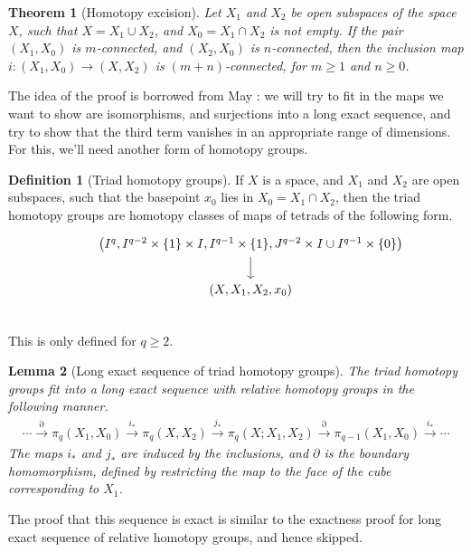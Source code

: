 \documentclass[12pt, notitlepage]{article}
\newtheorem{thm}{Theorem}[section]
\newtheorem{lem}[thm]{Lemma}
\theoremstyle{definition}
\newtheorem{defn}{Definition}[section]
\begin{document}
\begin{thm}[Homotopy excision]
  Let $X_1$ and $X_2$ be open subspaces of the space $X$, such that $X = X_1 \cup X_2$, and
  $X_0 = X_1 \cap X_2$ is not empty. If the pair $(X_1, X_0)$ is $m$-connected, and $(X_2, X_0)$ is
  $n$-connected, then the inclusion map $i: (X_1, X_0) \to (X, X_2)$ is $(m+n)$-connected, for
  $m \geq 1$ and $n \geq 0$.
\end{thm}
The idea of the proof is borrowed from May \cite{may} : we will try to fit in
the maps we want to show are isomorphisms, and surjections into a long exact sequence, and try to
show that the third term vanishes in an appropriate range of dimensions. For this, we'll need
another form of homotopy groups.

\begin{defn}[Triad homotopy groups]
  If $X$ is a space, and $X_1$ and $X_2$ are open subspaces, such that the basepoint $x_0$ lies in
  $X_0 = X_1 \cap X_2$, then the triad homotopy groups are homotopy classes of maps of tetrads of
  the following form.
  \[
    \begin{tikzcd}
      &\left( I^q, I^{q-2} \times \{1\} \times I, I^{q-1} \times \{1\}, J^{q-2} \times I \cup I^{q-1} \times \{0\} \right) \ar[d] \\
      &(X, X_1, X_2, x_0) \\
    \end{tikzcd}
  \]
  This is only defined for $q \geq 2$.
\end{defn}

\begin{lem}[Long exact sequence of triad homotopy groups]
  The triad homotopy groups fit into a long exact sequence with relative homotopy groups in the
  following manner.
  \begin{align*}
    \cdots \xrightarrow{\partial} \pi_q(X_1, X_0) \xrightarrow{i_{\ast}} \pi_q(X, X_2)
    \xrightarrow{j_{\ast}} \pi_q(X; X_1, X_2) \xrightarrow{\partial} \pi_{q-1}(X_1, X_0) \xrightarrow{i_{\ast}} \cdots
  \end{align*}
  The maps $i_{\ast}$ and $j_{\ast}$ are induced by the inclusions, and $\partial$ is the boundary
  homomorphism, defined by restricting the map to the face of the cube corresponding to $X_1$.
\end{lem}
The proof that this sequence is exact is similar to the exactness proof for long exact sequence of
relative homotopy groups, and hence skipped.
\end{document}
